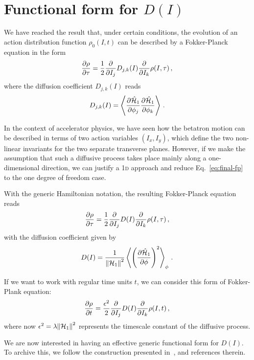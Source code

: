 \section{Functional form for $D(I)$}

We have reached the result that, under certain conditions, the evolution of an action distribution function $\rho_0(I, t)$ can be described by a Fokker-Planck equation in the form
\begin{equation}
    \pdv{\rho}{\tau}=\frac{1}{2}\pdv{}{I_j} D_{j,k}(I) \pdv{}{I_k}\rho(I,\tau)\,,
    \label{eq:final-fp}
\end{equation} 
where the diffusion coefficient $D_{j,k}(I)$ reads
\begin{equation}
    D_{j,k}(I) = \left\langle\pdv{\hat{\mathcal{H}}_1}{\phi_j}\pdv{\hat{\mathcal{H}}_1}{\phi_k}\right\rangle \,.
\end{equation}

In the context of accelerator physics, we have seen how the betatron motion can be described in terms of two action variables $(I_x, I_y)$, which define the two non-linear invariants for the two separate transverse planes. However, if we make the assumption that such a diffusive process takes place mainly along a one-dimensional direction, we can justify a 1\textsc{d} approach and reduce Eq.~\eqref{eq:final-fp} to the one degree of freedom case.

With the generic Hamiltonian notation, the resulting Fokker-Planck equation reads
\begin{equation}
    \pdv{\rho}{\tau}=\frac{1}{2}\pdv{}{I_j} D(I) \pdv{}{I_k}\rho(I,\tau)\,,
\end{equation}
with the diffusion coefficient given by
\begin{equation}
    D(I) = \frac{1}{\norm{\mathcal{H}_1}^2} \left\langle \left( \pdv{\hat{\mathcal{H}}_1}{\phi} \right)^2 \right\rangle_\phi \,.
\end{equation}

If we want to work with regular time units $t$, we can consider this form of Fokker-Plank equation:
\begin{equation}
    \pdv{\rho}{t}=\frac{\epsilon^2}{2}\pdv{}{I_j} D(I) \pdv{}{I_k}\rho(I,t)\,,
\end{equation}
where now $\epsilon^2 = \lambda\norm{\mathcal{H}_1}^2$ represents the timescale constant of the diffusive process.

We are now interested in having an effective generic functional form for $D(I)$. To archive this, we follow the construction presented in~\cite{}, and references therein.

